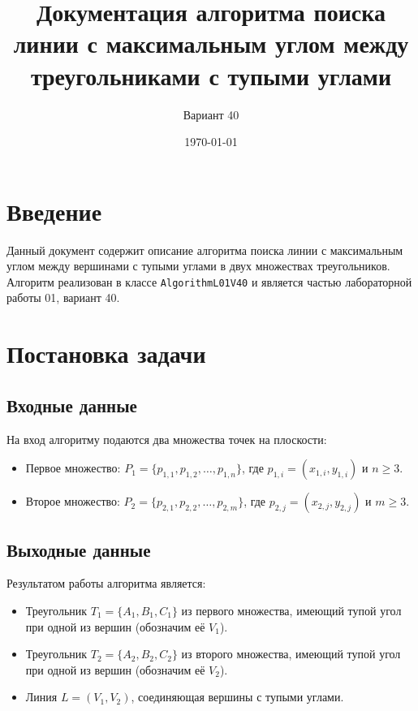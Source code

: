 \documentclass[a4paper,12pt]{article}
\title{Документация алгоритма поиска линии с максимальным углом между треугольниками с тупыми углами}
\author{Вариант 40}
\date{\today}
\begin{document}
\maketitle

\tableofcontents

\newpage

\section{Введение}

Данный документ содержит описание алгоритма поиска линии с максимальным углом между вершинами с тупыми углами в двух множествах треугольников. Алгоритм реализован в классе \texttt{AlgorithmL01V40} и является частью лабораторной работы 01, вариант 40.

\section{Постановка задачи}

\subsection{Входные данные}
На вход алгоритму подаются два множества точек на плоскости:
\begin{itemize}
    \item Первое множество: $P_1 = \{p_{1,1}, p_{1,2}, \ldots, p_{1,n}\}$, где $p_{1,i} = (x_{1,i}, y_{1,i})$ и $n \geq 3$.
    \item Второе множество: $P_2 = \{p_{2,1}, p_{2,2}, \ldots, p_{2,m}\}$, где $p_{2,j} = (x_{2,j}, y_{2,j})$ и $m \geq 3$.
\end{itemize}

\subsection{Выходные данные}
Результатом работы алгоритма является:
\begin{itemize}
    \item Треугольник $T_1 = \{A_1, B_1, C_1\}$ из первого множества, имеющий тупой угол при одной из вершин (обозначим её $V_1$).
    \item Треугольник $T_2 = \{A_2, B_2, C_2\}$ из второго множества, имеющий тупой угол при одной из вершин (обозначим её $V_2$).
    \item Линия $L = (V_1, V_2)$, соединяющая вершины с тупыми углами.
\end{itemize}
\end{document}
